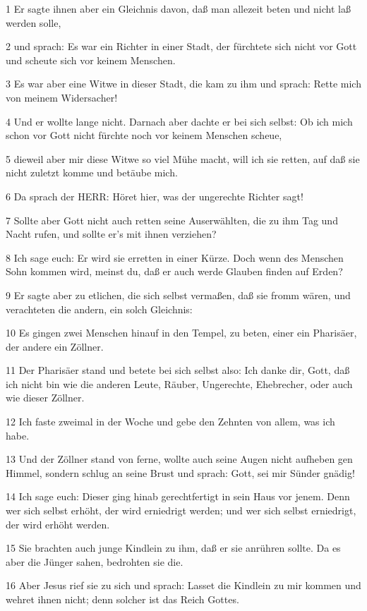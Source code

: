 \par 1 Er sagte ihnen aber ein Gleichnis davon, daß man allezeit beten und nicht laß werden solle,
\par 2 und sprach: Es war ein Richter in einer Stadt, der fürchtete sich nicht vor Gott und scheute sich vor keinem Menschen.
\par 3 Es war aber eine Witwe in dieser Stadt, die kam zu ihm und sprach: Rette mich von meinem Widersacher!
\par 4 Und er wollte lange nicht. Darnach aber dachte er bei sich selbst: Ob ich mich schon vor Gott nicht fürchte noch vor keinem Menschen scheue,
\par 5 dieweil aber mir diese Witwe so viel Mühe macht, will ich sie retten, auf daß sie nicht zuletzt komme und betäube mich.
\par 6 Da sprach der HERR: Höret hier, was der ungerechte Richter sagt!
\par 7 Sollte aber Gott nicht auch retten seine Auserwählten, die zu ihm Tag und Nacht rufen, und sollte er's mit ihnen verziehen?
\par 8 Ich sage euch: Er wird sie erretten in einer Kürze. Doch wenn des Menschen Sohn kommen wird, meinst du, daß er auch werde Glauben finden auf Erden?
\par 9 Er sagte aber zu etlichen, die sich selbst vermaßen, daß sie fromm wären, und verachteten die andern, ein solch Gleichnis:
\par 10 Es gingen zwei Menschen hinauf in den Tempel, zu beten, einer ein Pharisäer, der andere ein Zöllner.
\par 11 Der Pharisäer stand und betete bei sich selbst also: Ich danke dir, Gott, daß ich nicht bin wie die anderen Leute, Räuber, Ungerechte, Ehebrecher, oder auch wie dieser Zöllner.
\par 12 Ich faste zweimal in der Woche und gebe den Zehnten von allem, was ich habe.
\par 13 Und der Zöllner stand von ferne, wollte auch seine Augen nicht aufheben gen Himmel, sondern schlug an seine Brust und sprach: Gott, sei mir Sünder gnädig!
\par 14 Ich sage euch: Dieser ging hinab gerechtfertigt in sein Haus vor jenem. Denn wer sich selbst erhöht, der wird erniedrigt werden; und wer sich selbst erniedrigt, der wird erhöht werden.
\par 15 Sie brachten auch junge Kindlein zu ihm, daß er sie anrühren sollte. Da es aber die Jünger sahen, bedrohten sie die.
\par 16 Aber Jesus rief sie zu sich und sprach: Lasset die Kindlein zu mir kommen und wehret ihnen nicht; denn solcher ist das Reich Gottes.
